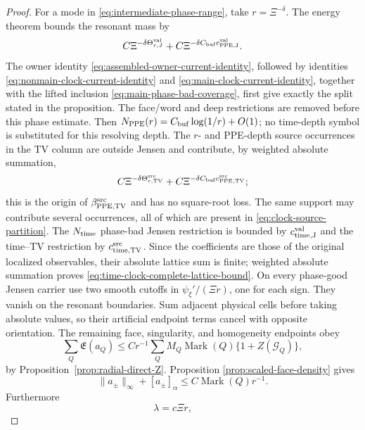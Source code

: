 \documentclass[11pt]{article}
\begin{document}
\begin{proof}
For a mode in \eqref{eq:intermediate-phase-range}, take
\(r=\Xi^{-\delta}\).  The energy theorem bounds the resonant mass by
\begin{equation}
\label{eq:phase-energy-all-tails}
 C\Xi^{-\delta\Theta_{r,J}^{\rm val}}
 +C\Xi^{-\delta C_{\rm buf}c_{\rm PPE,J}^{\rm val}}.
\end{equation}
The owner identity \eqref{eq:assembled-owner-current-identity}, followed by
identities \eqref{eq:nonmain-clock-current-identity} and
\eqref{eq:main-clock-current-identity}, together with the lifted inclusion
\eqref{eq:main-phase-bad-coverage}, first give exactly the split stated in
the proposition.  The face/word and deep restrictions are removed before
this phase estimate.  Then
$N_{\rm PPE}(r)=C_{\rm buf}\log(1/r)+O(1)$; no time-depth symbol is
substituted for this resolving depth.  The $r$- and PPE-depth source
occurrences in the TV column are outside Jensen and contribute, by weighted
absolute summation,
\begin{equation}
\label{eq:phase-PPE-TV-tails}
 C\Xi^{-\delta\Theta_{r,\rm TV}^{\rm src}}
 +C\Xi^{-\delta C_{\rm buf}c_{\rm PPE,TV}^{\rm src}};
\end{equation}
this is the origin of $\beta_{\rm PPE,TV}^{\rm src}$ and has no square-root
loss.  The same support may contribute several occurrences, all of which are
present in \eqref{eq:clock-source-partition}.
The $N_{\rm time}$ phase-bad Jensen restriction is bounded by
$c_{\rm time,J}^{\rm val}$ and the time--TV restriction by
$c_{\rm time,TV}^{\rm src}$.  Since the coefficients are those of the
original localized observables, their absolute lattice sum is finite;
weighted absolute summation proves
\eqref{eq:time-clock-complete-lattice-bound}.  On every phase-good Jensen
carrier use two smooth
cutoffs in
\(\psi_\xi'/(\Xi r)\), one for each sign.  They vanish on the resonant
boundaries.  Sum adjacent physical cells before taking absolute values, so
their artificial endpoint terms cancel with opposite orientation.  The
remaining face, singularity, and homogeneity endpoints obey
\begin{equation}
\label{eq:phase-endpoint-ledger}
 \sum_Q\mathfrak E(a_Q)
 \le Cr^{-1}\sum_QM_Q\operatorname{Mark}(Q)
       \{1+Z(\mathcal G_Q)\},
\end{equation}
by Proposition~\ref{prop:radial-direct-Z}.  Proposition
\ref{prop:scaled-face-density} gives
\[
 \|a_\pm\|_\infty+[a_\pm]_\alpha
 \le C\operatorname{Mark}(Q) r^{-1}.
\]
Furthermore
\[
 \lambda=c\Xi r,\qquad
\]
\end{proof}
\end{document}
